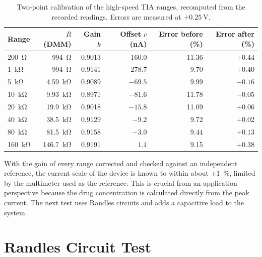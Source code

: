 \begin{table}[!htbp]
  \centering
  \small
  \setlength{\aboverulesep}{0pt}
  \setlength{\belowrulesep}{0pt}
  \renewcommand{\arraystretch}{1.2}
  \caption{Two-point calibration of the high-speed TIA ranges, recomputed from
    the recorded readings. Errors are measured at $+\SI{0.25}{\volt}$.}
  \label{tab:rtia_cal_tbl}
  \begin{tabular}{@{}l r r | r | r r@{}}
    \toprule
    \textbf{Range} & \textbf{$R$ (DMM)} & \textbf{Gain $k$} & \textbf{Offset $c$ (nA)}
      & \textbf{Error before (\%)} & \textbf{Error after (\%)} \\
    \midrule
    \SI{200}{\ohm}       & \SI{994}{\ohm}         & 0.9013 & 160.0   & 11.36 & $+0.44$ \\
    \SI{1}{\kilo\ohm}    & \SI{994}{\ohm}         & 0.9141 & 278.7   &  9.70 & $+0.40$ \\
    \SI{5}{\kilo\ohm}    & \SI{4.59}{\kilo\ohm}   & 0.9089 & $-69.5$ &  9.99 & $-0.16$ \\
    \SI{10}{\kilo\ohm}   & \SI{9.93}{\kilo\ohm}   & 0.8971 & $-81.6$ & 11.78 & $-0.05$ \\
    \SI{20}{\kilo\ohm}   & \SI{19.9}{\kilo\ohm}   & 0.9018 & $-15.8$ & 11.09 & $+0.06$ \\
    \SI{40}{\kilo\ohm}   & \SI{38.5}{\kilo\ohm}   & 0.9129 & $-9.2$  &  9.72 & $+0.02$ \\
    \SI{80}{\kilo\ohm}   & \SI{81.5}{\kilo\ohm}   & 0.9158 & $-3.0$  &  9.44 & $+0.13$ \\
    \SI{160}{\kilo\ohm}  & \SI{146.7}{\kilo\ohm}  & 0.9191 & $1.1$   &  9.15 & $+0.38$ \\
    \bottomrule
  \end{tabular}
\end{table}

With the gain of every range corrected and checked against an independent
reference, the current scale of the device is known to within about
$\pm$\SI{1}{\percent}, limited by the multimeter used as the reference. This is crucial from an application perspective because the drug concentration is calculated
directly from the peak current. The next test uses Randles circuits and adds a capacitive load to the system.

\section{Randles Circuit Test}
\label{sec:randles_test}

